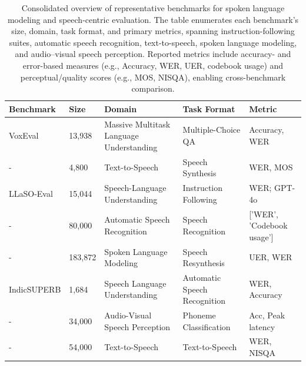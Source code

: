 
    \begin{table}[h!]
    \centering
    \footnotesize %
    \begin{tabular}{p{} p{} p{} p{} p{}}
    \toprule
    \textbf{Benchmark} & \textbf{Size} & \textbf{Domain} & \textbf{Task Format} & \textbf{Metric} \\
\midrule
VoxEval \cite{cui2025voxevalbenchmarkingknowledgeunderstandin} & 13,938 & Massive Multitask Language Understanding & Multiple-Choice QA & Accuracy, WER \\
- \cite{wang2024evaluatingtextspeechsynthesislargediscre} & 4,800 & Text-to-Speech & Speech Synthesis & WER, MOS \\
LLaSO-Eval \cite{sun2025llasofoundationalframeworkreproduciblere} & 15,044 & Speech-Language Understanding & Instruction Following & WER; GPT-4o \\
- \cite{zhang2025impactframeratesspeechtokenizercasestudy} & 80,000 & Automatic Speech Recognition & Speech Recognition & ['WER', 'Codebook usage'] \\
- \cite{park2023howgenerativespokenlanguagemodelingencod} & 183,872 & Spoken Language Modeling & Speech Resynthesis & UER, WER \\
IndicSUPERB \cite{entry2025indicsuperbspeechprocessinguniversalperf} & 1,684 & Speech Language Understanding & Automatic Speech Recognition & WER, Accuracy \\
- \cite{wang2025roleaudiovisualintegrationtimecoursephon} & 34,000 & Audio-Visual Speech Perception & Phoneme Classification & Acc, Peak latency \\
- \cite{li2024investigatingneuralaudiocodecsspeechlang} & 54,000 & Text-to-Speech & Text-to-Speech & WER, NISQA \\

    \bottomrule
    \end{tabular}%
    \caption{Consolidated overview of representative benchmarks for spoken language modeling and speech-centric evaluation. The table enumerates each benchmark's size, domain, task format, and primary metrics, spanning instruction-following suites, automatic speech recognition, text-to-speech, spoken language modeling, and audio–visual speech perception. Reported metrics include accuracy- and error-based measures (e.g., Accuracy, WER, UER, codebook usage) and perceptual/quality scores (e.g., MOS, NISQA), enabling cross-benchmark comparison.}
    \label{tab:benchmark_table}
    \end{table}
    